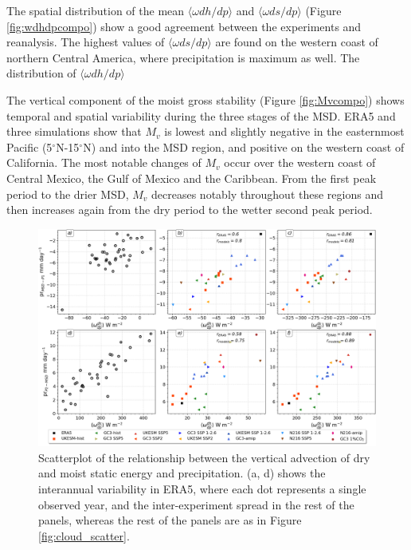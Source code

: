 The spatial distribution of the mean $\langle \omega dh/dp \rangle$ and $\langle \omega ds/dp \rangle$ (Figure \ref{fig:wdhdpcompo}) show a good agreement between the experiments and reanalysis. The highest values of $\langle \omega ds/dp \rangle$ are found on the western coast of northern Central America, where precipitation is maximum as well. The distribution of $\langle \omega dh/dp \rangle$

The vertical component of the moist gross stability (Figure \ref{fig:Mvcompo}) shows temporal and spatial variability during the three stages of the MSD. ERA5 and three simulations show that $M_v$ is lowest and slightly negative in the easternmost Pacific (5$^\circ$N-15$^\circ$N) and into the MSD region, and positive on the western coast of California. The most notable changes of $M_v$ occur over the western coast of Central Mexico, the Gulf of Mexico and the Caribbean. From the first peak period to the drier MSD, $M_v$ decreases notably throughout these regions and then increases again from the dry period to the wetter second peak period. 

\begin{figure}[t!]
\includegraphics[width=\linewidth]{figures/thermo_scatter}
\caption[Scatterplot of the vertical advection of dry and moist static energy against precipitation]{Scatterplot of the relationship between the vertical advection of dry and moist static energy and precipitation. (a, d) shows the interannual variability in ERA5, where each dot represents a single observed year, and the inter-experiment spread in the rest of the panels, whereas the rest of the panels are as in Figure \ref{fig:cloud_scatter}.    }
\label{fig:thermo_scatter}
\end{figure}

